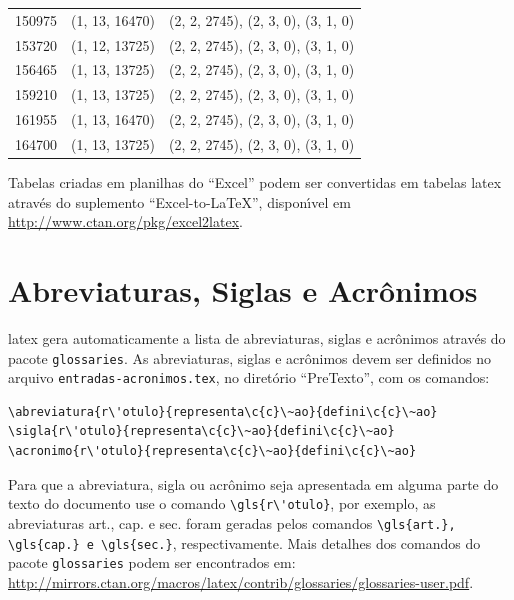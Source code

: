 \begin{longtable}{@{\extracolsep{\fill}}lll}
150975 & (1, 13, 16470) & (2, 2, 2745), (2, 3, 0), (3, 1, 0)                  \\
153720 & (1, 12, 13725) & (2, 2, 2745), (2, 3, 0), (3, 1, 0)                  \\
156465 & (1, 13, 13725) & (2, 2, 2745), (2, 3, 0), (3, 1, 0)                  \\
159210 & (1, 13, 13725) & (2, 2, 2745), (2, 3, 0), (3, 1, 0)                  \\
161955 & (1, 13, 16470) & (2, 2, 2745), (2, 3, 0), (3, 1, 0)                  \\
164700 & (1, 13, 13725) & (2, 2, 2745), (2, 3, 0), (3, 1, 0)                  \\
\end{longtable}

Tabelas criadas em planilhas do ``Excel'' podem ser convertidas em tabelas \gls{latex} atrav\'es do suplemento ``Excel-to-LaTeX'', dispon\'{\i}vel em \url{http://www.ctan.org/pkg/excel2latex}.

\section{Abreviaturas, Siglas e Acr\^onimos}\label{sec:acronimos}

\gls{latex} gera automaticamente a lista de abreviaturas, siglas e acr\^onimos atrav\'es do pacote \texttt{glossaries}. As abreviaturas, siglas e acr\^onimos devem ser definidos no arquivo \texttt{entradas-acronimos.tex}, no diret\'orio ``PreTexto'', com os comandos:

\begin{SingleSpacing}%
\begin{verbatim}
\abreviatura{r\'otulo}{representa\c{c}\~ao}{defini\c{c}\~ao}
\sigla{r\'otulo}{representa\c{c}\~ao}{defini\c{c}\~ao}
\acronimo{r\'otulo}{representa\c{c}\~ao}{defini\c{c}\~ao}
\end{verbatim}
\end{SingleSpacing}

Para que a abreviatura, sigla ou acr\^onimo seja apresentada em alguma parte do texto do documento use o comando \verb|\gls{r\'otulo}|, por exemplo, as abreviaturas \gls{art.}, \gls{cap.} e \gls{sec.} foram geradas pelos comandos \verb|\gls{art.}, \gls{cap.} e \gls{sec.}|, respectivamente. Mais detalhes dos comandos do pacote \texttt{glossaries} podem ser encontrados em: \url{http://mirrors.ctan.org/macros/latex/contrib/glossaries/glossaries-user.pdf}.

